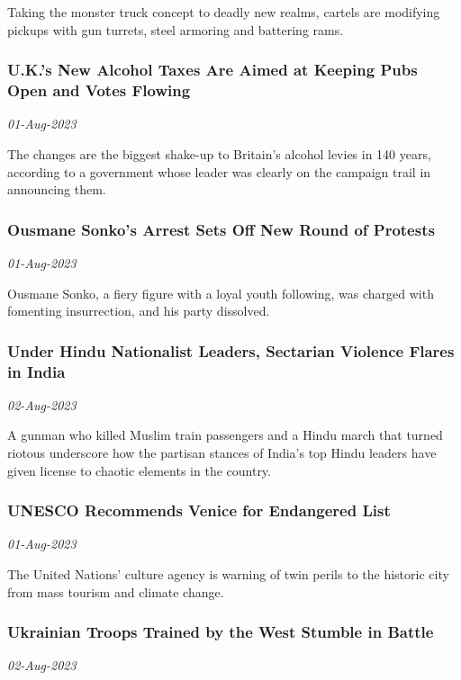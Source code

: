 Taking the monster truck concept to deadly new realms, cartels are modifying pickups with gun turrets, steel armoring and battering rams.
\subsubsection{U.K.’s New Alcohol Taxes Are Aimed at Keeping Pubs Open and Votes Flowing \href{https://www.nytimes.com/2023/08/01/world/europe/uk-alcohol-levies.html}{}}
\textit{01-Aug-2023}

The changes are the biggest shake-up to Britain’s alcohol levies in 140 years, according to a government whose leader was clearly on the campaign trail in announcing them.
\subsubsection{Ousmane Sonko’s Arrest Sets Off New Round of Protests \href{https://www.nytimes.com/2023/08/01/world/africa/senegal-protests-sonko.html}{}}
\textit{01-Aug-2023}

Ousmane Sonko, a fiery figure with a loyal youth following, was charged with fomenting insurrection, and his party dissolved.
\subsubsection{Under Hindu Nationalist Leaders, Sectarian Violence Flares in India \href{https://www.nytimes.com/2023/08/01/world/asia/india-hindu-muslim-violence.html}{}}
\textit{02-Aug-2023}

A gunman who killed Muslim train passengers and a Hindu march that turned riotous underscore how the partisan stances of India’s top Hindu leaders have given license to chaotic elements in the country.
\subsubsection{UNESCO Recommends Venice for Endangered List \href{https://www.nytimes.com/2023/08/01/world/europe/venice-unesco-world-heritage-danger-list.html}{}}
\textit{01-Aug-2023}

The United Nations’ culture agency is warning of twin perils to the historic city from mass tourism and climate change.
\subsubsection{Ukrainian Troops Trained by the West Stumble in Battle \href{https://www.nytimes.com/2023/08/02/us/politics/ukraine-troops-counteroffensive-training.html}{}}
\textit{02-Aug-2023}

